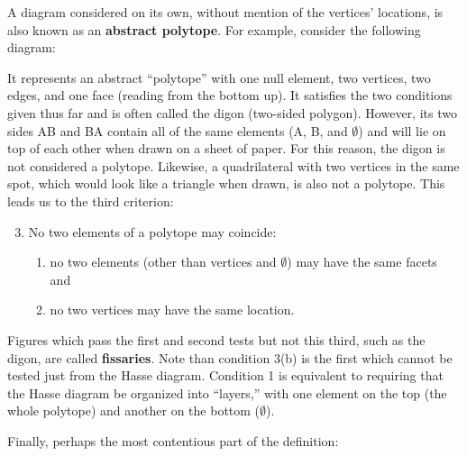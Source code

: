 \documentclass{article}
\begin{document}
A diagram considered on its own, without mention of the vertices' locations,
is also known as an \textbf{abstract polytope}.
For example, consider the following diagram:

\begin{center}
\end{center}

It represents an abstract ``polytope'' with
one null element, two vertices, two edges, and one face (reading from the bottom up).
It satisfies the two conditions given thus far and is often called the digon (two-sided polygon).
However, its two sides AB and BA contain all of the same elements (A, B, and $\emptyset$)
and will lie on top of each other when drawn on a sheet of paper.
For this reason, the digon is not considered a polytope.
Likewise, a quadrilateral with two vertices in the same spot,
which would look like a triangle when drawn, is also not a polytope.
This leads us to the third criterion:

\begin{enumerate}
  \setcounter{enumi}{2}
\item No two elements of a polytope may coincide:
  \begin{enumerate}
  \item no two elements (other than vertices and $\emptyset$) may have the same facets and
  \item no two vertices may have the same location.
  \end{enumerate}
\end{enumerate}

Figures which pass the first and second tests but not this third,
such as the digon, are called \textbf{fissaries}.
Note than condition 3(b) is the first which cannot be tested just from the Hasse diagram.
Condition 1 is equivalent to requiring that the Hasse diagram be organized into ``layers,''
with one element on the top (the whole polytope) and another on the bottom ($\emptyset$).

Finally, perhaps the most contentious part of the definition: 
\end{document}
